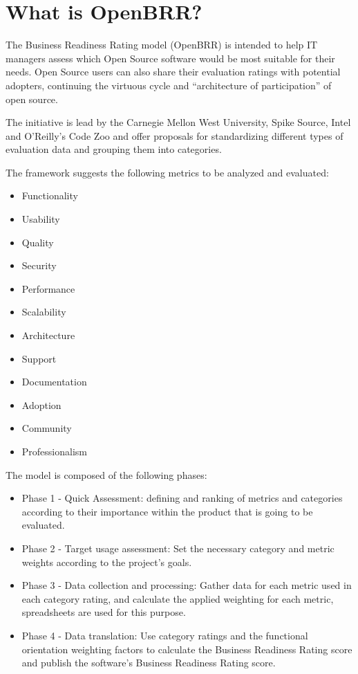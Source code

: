 \documentclass[a4paper,12pt]{book}
\begin{document}
\section{What is OpenBRR?}
\label{sec:openbrr2}

The Business Readiness Rating model (OpenBRR)\cite{OpenBRRWhitepaper} is
intended to help IT managers assess which Open Source software would be most suitable for their needs. Open Source users can also share their evaluation ratings with potential adopters, continuing the virtuous cycle and “architecture of participation” of open
source.

The initiative\cite{The OpenBRR Corporate Community}  is lead by the Carnegie Mellon West University, Spike Source, Intel and O’Reilly’s Code Zoo and offer proposals for standardizing different types of evaluation data and grouping them into categories.

The framework suggests the following metrics to be analyzed and evaluated:
\begin{itemize}
\item Functionality
\item Usability
\item Quality
\item Security
\item Performance
\item Scalability
\item Architecture
\item Support
\item Documentation
\item Adoption
\item Community
\item Professionalism
\end{itemize}

The model is composed of the following phases:
\begin{itemize}
\item Phase 1 - Quick Assessment: defining and ranking of metrics and categories according to their importance within the product that is going to be evaluated.
\item Phase 2 - Target usage assessment: Set the necessary category and metric weights according to the project's goals.
\item Phase 3 - Data collection and processing: Gather data for each metric used in each category rating, and calculate the applied weighting for each metric, spreadsheets are used for this purpose.
\item Phase 4 - Data translation: Use category ratings and the functional orientation weighting factors to calculate the Business Readiness Rating score and publish the software’s Business Readiness Rating score.
\end{itemize}
\end{document}
